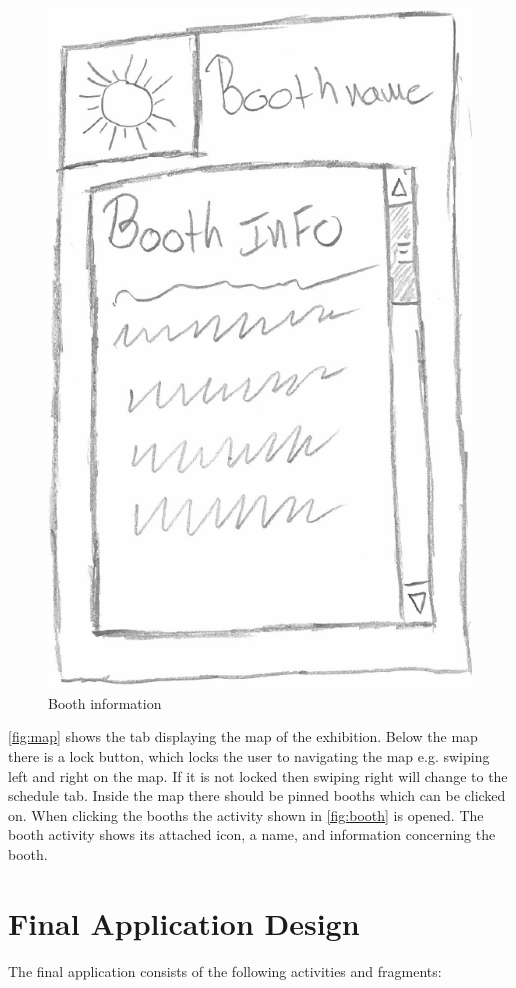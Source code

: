 \begin{figure}[H]
\begin{minipage}[b]{0.5\columnwidth}
\includegraphics[width=0.7\columnwidth]{img/prototype/8.png}
\caption{Booth information\label{fig:booth}}
\end{minipage}
\end{figure}

\autoref{fig:map} shows the tab displaying the map of the exhibition. Below the map there is a lock button, which locks the user to navigating the map e.g. swiping left and right on the map. If it is not locked then swiping right will change to the schedule tab. Inside the map there should be pinned booths which can be clicked on. When clicking the booths the activity shown in \autoref{fig:booth} is opened. The booth activity shows its attached icon, a name, and information concerning the booth.

\section{Final Application Design}

The final application consists of the following activities and fragments:

